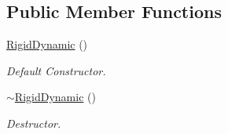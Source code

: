 \subsection*{Public Member Functions}
\begin{DoxyCompactItemize}
\item 
\hypertarget{classContent_1_1Actor_1_1Physics_1_1RigidDynamic_a464e634bf5cff914beb4979ffeb8f257}{
\hyperlink{classContent_1_1Actor_1_1Physics_1_1RigidDynamic_a464e634bf5cff914beb4979ffeb8f257}{RigidDynamic} ()}
\label{classContent_1_1Actor_1_1Physics_1_1RigidDynamic_a464e634bf5cff914beb4979ffeb8f257}

\begin{DoxyCompactList}\small\item\em Default Constructor. \item\end{DoxyCompactList}\item 
\hypertarget{classContent_1_1Actor_1_1Physics_1_1RigidDynamic_ae183ac387aa012227d215cab03a2de9a}{
\hyperlink{classContent_1_1Actor_1_1Physics_1_1RigidDynamic_ae183ac387aa012227d215cab03a2de9a}{$\sim$RigidDynamic} ()}
\label{classContent_1_1Actor_1_1Physics_1_1RigidDynamic_ae183ac387aa012227d215cab03a2de9a}

\begin{DoxyCompactList}\small\item\em Destructor. \item\end{DoxyCompactList}\end{DoxyCompactItemize}
